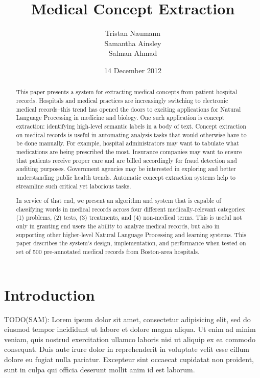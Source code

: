 \documentclass[preprint]{style}
\begin{document}
\title{Medical Concept Extraction}

\author{
\alignauthor
Tristan Naumann\\
\alignauthor
Samantha Ainsley\\
\alignauthor
Salman Ahmad\\
}

\date{14 December 2012}

\maketitle
\begin{abstract}

This paper presents a system for extracting medical concepts from patient hospital records. Hospitals and medical practices are increasingly switching to electronic medical records--this trend has opened the doors to exciting applications for Natural Language Processing in medicine and biology. One such application is concept extraction: identifying high-level semantic labels in a body of text. Concept extraction on medical records is useful in automating analysis tasks that would otherwise have to be done manually. For example, hospital administrators may want to tabulate what medications are being prescribed the most. Insurance companies may want to ensure that patients receive proper care and are billed accordingly for fraud detection and auditing purposes. Government agencies may be interested in exploring and better understanding public health trends. Automatic concept extraction systems help to streamline such critical yet laborious tasks.

In service of that end, we present an algorithm and system that is capable of classifying words in medical records across four different medically-relevant categories: (1) problems, (2) tests, (3) treatments, and (4) non-medical terms. This is useful not only in granting end users the ability to analyze medical records, but also in supporting other higher-level Natural Language Processing and learning systems. This paper describes the system's design, implementation, and performance when tested on set of 500 pre-annotated medical records from Boston-area hospitals.


\end{abstract}

\section{Introduction}
TODO(SAM):
Lorem ipsum dolor sit amet, consectetur adipisicing elit, sed do eiusmod tempor incididunt ut labore et dolore magna aliqua. Ut enim ad minim veniam, quis nostrud exercitation ullamco laboris nisi ut aliquip ex ea commodo consequat. Duis aute irure dolor in reprehenderit in voluptate velit esse cillum dolore eu fugiat nulla pariatur. Excepteur sint occaecat cupidatat non proident, sunt in culpa qui officia deserunt mollit anim id est laborum.
\end{document}
